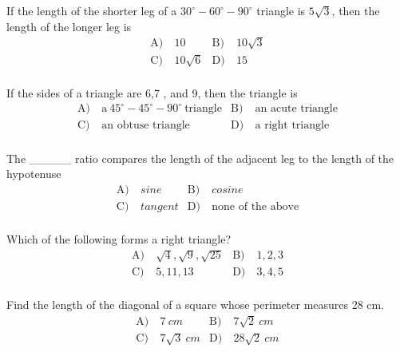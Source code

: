 \begin{problem}\label{PreCal-9}
If the length of the shorter leg of a $30^{\circ}-60^{\circ}-90^{\circ}$ triangle is $5 \sqrt{3}$, then the length of the longer leg is
\begin{align*}
\text{A)}\ & 10 &
\text{B)}\ & 10 \sqrt{3} \\
\text{C)}\ & 10 \sqrt{6}  &
\text{D)}\ & 15\\
\end{align*}    
\end{problem}


\begin{problem}\label{PreCal-10}
If the sides of a triangle are 6,7 , and 9, then the triangle is
\begin{align*}
\text{A)}\ & \text{a} \ 45^{\circ}-45^{\circ}-90^{\circ} \ \text{triangle} &
\text{B)}\ &  \text{an acute triangle}\\
\text{C)}\ &  \text{an obtuse triangle} &
\text{D)}\ & \text{a right triangle}\\
\end{align*}    
\end{problem}


\begin{problem}\label{Geo12}
The \_\_\_\_\_ ratio compares the length of the adjacent leg to the length of the hypotenuse 
\begin{align*}
\text{A)}\ & sine &
\text{B)}\ & cosine  \\
\text{C)}\ & tangent  &
\text{D)}\ & \text{none of the above}\\
\end{align*}    
\end{problem}


\begin{problem}\label{Geo13}
  Which of the following forms a right triangle?
\begin{align*}
\text{A)}\ & \sqrt{4},\sqrt{9},\sqrt{25} &
\text{B)}\ & 1,2,3  \\
\text{C)}\ & 5,11,13  &
\text{D)}\ & 3,4,5\\
\end{align*}    
\end{problem}


\begin{problem}\label{Geo14}
Find the length of the diagonal of a square whose perimeter measures 28 cm.
\begin{align*}
\text{A)}\ & 7 \ cm &
\text{B)}\ & 7\sqrt{2} \ cm  \\
\text{C)}\ & 7\sqrt{3} \ cm  &
\text{D)}\ & 28\sqrt{2}\  cm\\
\end{align*}    
\end{problem}


